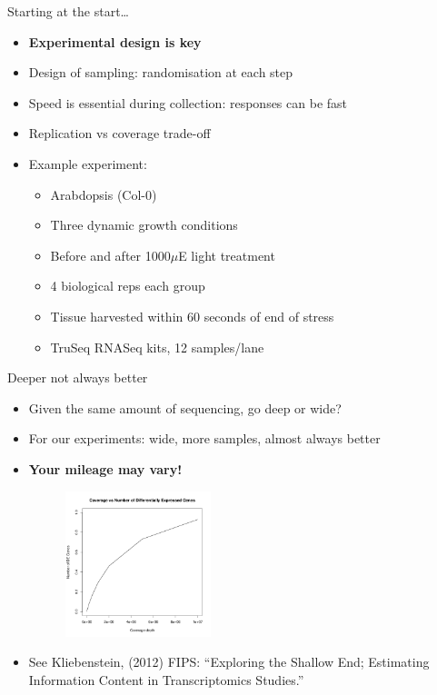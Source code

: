 \documentclass[t]{beamer}
\begin{document}
\begin{frame}{Starting at the start\ldots}
  \begin{itemize}
    \item \textbf{Experimental design is key}
    \pause
    \item Design of sampling: randomisation at each step
    \pause
    \item Speed is essential during collection: responses can be fast
    \pause
    \item Replication vs coverage trade-off
    \pause
    \item Example experiment:
    \begin{itemize}
      \item Arabdopsis (Col-0)
      \item Three dynamic growth conditions
      \item Before and after 1000$\mu$E light treatment
      \item 4 biological reps each group
      \item Tissue harvested within 60 seconds of end of stress
      \item TruSeq RNASeq kits, 12 samples/lane
    \end{itemize}
  \end{itemize}
\end{frame}

\begin{frame}{Deeper not always better}
  \begin{itemize}
    \item Given the same amount of sequencing, go deep or wide?
    \pause
    \item For our experiments: wide, more samples, almost always better
    \item \textbf{Your mileage may vary!}
    \pause
    \begin{figure}[h]
      \begin{center}
        \includegraphics[width=0.4\textwidth]{./img/coverage.png}
      \end{center}
    \end{figure}
    \pause
    \item \tiny{See Kliebenstein, (2012) FIPS: “Exploring the Shallow End;
                Estimating Information Content in Transcriptomics Studies.”}
  \end{itemize}
\end{frame}
\end{document}
